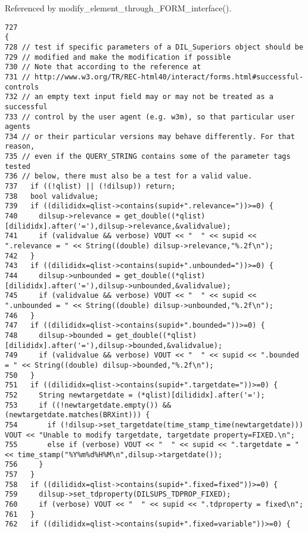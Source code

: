 Referenced by modify\_\-element\_\-through\_\-FORM\_\-interface().



\footnotesize\begin{verbatim}727                                                                                                                                    {
728 // test if specific parameters of a DIL_Superiors object should be
729 // modified and make the modification if possible
730 // Note that according to the reference at
731 // http://www.w3.org/TR/REC-html40/interact/forms.html#successful-controls
732 // an empty text input field may or may not be treated as a successful
733 // control by the user agent (e.g. w3m), so that particular user agents
734 // or their particular versions may behave differently. For that reason,
735 // even if the QUERY_STRING contains some of the parameter tags tested
736 // below, there must also be a test for a valid value.
737   if ((!qlist) || (!dilsup)) return;
738   bool validvalue;
739   if ((dilididx=qlist->contains(supid+".relevance="))>=0) {
740     dilsup->relevance = get_double((*qlist)[dilididx].after('='),dilsup->relevance,&validvalue);
741     if (validvalue && verbose) VOUT << "  " << supid << ".relevance = " << String((double) dilsup->relevance,"%.2f\n");
742   }
743   if ((dilididx=qlist->contains(supid+".unbounded="))>=0) {
744     dilsup->unbounded = get_double((*qlist)[dilididx].after('='),dilsup->unbounded,&validvalue);
745     if (validvalue && verbose) VOUT << "  " << supid << ".unbounded = " << String((double) dilsup->unbounded,"%.2f\n");
746   }
747   if ((dilididx=qlist->contains(supid+".bounded="))>=0) {
748     dilsup->bounded = get_double((*qlist)[dilididx].after('='),dilsup->bounded,&validvalue);
749     if (validvalue && verbose) VOUT << "  " << supid << ".bounded = " << String((double) dilsup->bounded,"%.2f\n");
750   }
751   if ((dilididx=qlist->contains(supid+".targetdate="))>=0) {
752     String newtargetdate = (*qlist)[dilididx].after('=');
753     if ((!newtargetdate.empty()) && (newtargetdate.matches(BRXint))) {
754       if (!dilsup->set_targetdate(time_stamp_time(newtargetdate))) VOUT << "Unable to modify targetdate, targetdate property=FIXED.\n";
755       else if (verbose) VOUT << "  " << supid << ".targetdate = " << time_stamp("%Y%m%d%H%M\n",dilsup->targetdate());
756     }
757   }
758   if ((dilididx=qlist->contains(supid+".fixed=fixed"))>=0) {
759     dilsup->set_tdproperty(DILSUPS_TDPROP_FIXED);
760     if (verbose) VOUT << "  " << supid << ".tdproperty = fixed\n";
761   }
762   if ((dilididx=qlist->contains(supid+".fixed=variable"))>=0) {

\end{verbatim}
